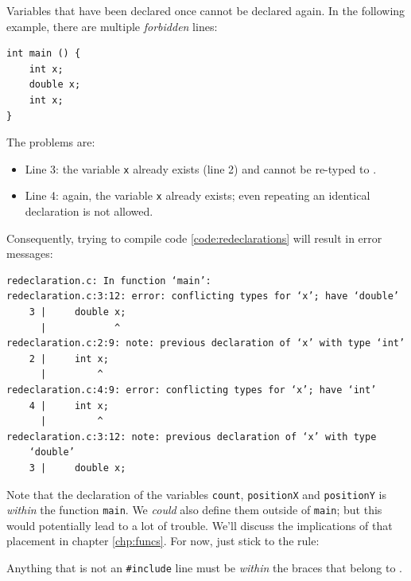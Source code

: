 \begin{warnbox}
Variables that have been declared once cannot be declared again. In the following example, there are multiple \emph{forbidden} lines:
\vspace{3pt}

\begin{codebox}[redeclaration.c]
\begin{verbatim}
int main () {
    int x;
    double x;
    int x;
}
\end{verbatim}
 \label{code:redeclarations}
\end{codebox}
The problems are: \vspace{-6pt}
\begin{itemize}
\item Line 3: the variable \texttt{x} already exists (line 2) and cannot be re-typed to .
\item Line 4: again, the variable \texttt{x} already exists; even repeating an identical declaration is not allowed.
\end{itemize}

Consequently, trying to compile code \ref{code:redeclarations} will result in error messages:
\begin{cmdbox}
\begin{verbatim}
redeclaration.c: In function ‘main’:
redeclaration.c:3:12: error: conflicting types for ‘x’; have ‘double’
    3 |     double x;
      |            ^
redeclaration.c:2:9: note: previous declaration of ‘x’ with type ‘int’
    2 |     int x;
      |         ^
redeclaration.c:4:9: error: conflicting types for ‘x’; have ‘int’
    4 |     int x;
      |         ^
redeclaration.c:3:12: note: previous declaration of ‘x’ with type
    ‘double’
    3 |     double x;
\end{verbatim}
\end{cmdbox}
\end{warnbox}

\begin{warnbox}
Note that the declaration of the variables \texttt{count}, \texttt{positionX} and \texttt{positionY} is \emph{within} the function \texttt{main}. We \emph{could} also define them outside of \texttt{main}; but this would potentially lead to a lot of trouble. We'll discuss the implications of that placement in chapter \ref{chp:funcs}. For now, just stick to the rule:

Anything that is not an \texttt{\#include} line must be \emph{within} the braces that belong to .
\end{warnbox}



